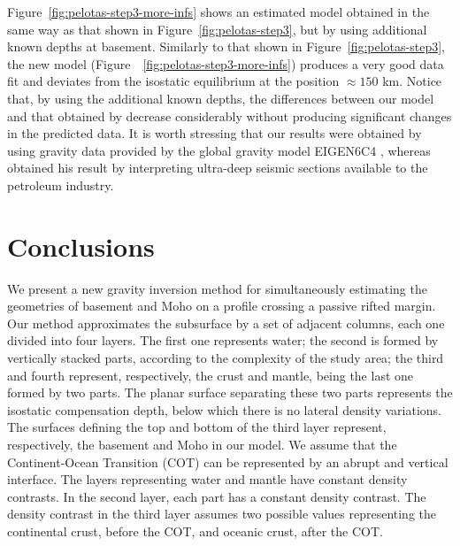 \documentclass[manuscript]{geophysics}
\begin{document}
Figure~\ref{fig:pelotas-step3-more-infs} shows an estimated model
obtained in the same way as that shown in Figure~\ref{fig:pelotas-step3},
but by using additional known depths at basement.
Similarly to that shown in Figure~\ref{fig:pelotas-step3},
the new model (Figure~~\ref{fig:pelotas-step3-more-infs}) produces a very good data fit 
and deviates from the isostatic equilibrium at the position $\approx 150$ km. 
Notice that, by using the additional known depths, the differences between our model
and that obtained by \citet{zalan2015} decrease considerably without producing
significant changes in the predicted data.
It is worth stressing that our results were obtained by using gravity data
provided by the global gravity model EIGEN6C4 \citep{forste2014}, whereas 
\citet{zalan2015} obtained his result by interpreting ultra-deep seismic sections
available to the petroleum industry.


\section{Conclusions}

We present a new gravity inversion method for simultaneously estimating the 
geometries of basement and Moho on a profile crossing a passive rifted margin.
Our method approximates the subsurface by a set of adjacent columns, each one divided
into four layers. The first one represents water; the second is formed by vertically
stacked parts, according to the complexity of the study area; the third and fourth represent,
respectively, the crust and mantle, being the last one formed by two parts.
The planar surface separating these two parts represents the isostatic compensation depth,
below which there is no lateral density variations.
The surfaces defining the top and bottom of the third layer represent, respectively, 
the basement and Moho in our model.
We assume that the Continent-Ocean Transition (COT) can be represented by an abrupt and 
vertical interface.
The layers representing water and mantle have constant density contrasts.
In the second layer, each part has a constant density contrast.
The density contrast in the third layer assumes two possible values representing
the continental crust, before the COT, and oceanic crust, after the COT.
\end{document}
